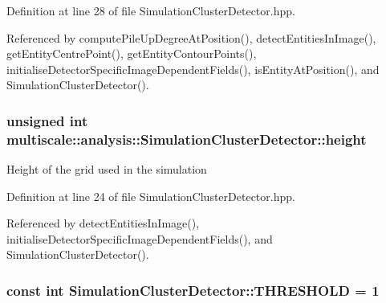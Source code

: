 \-Definition at line 28 of file \-Simulation\-Cluster\-Detector.\-hpp.



\-Referenced by compute\-Pile\-Up\-Degree\-At\-Position(), detect\-Entities\-In\-Image(), get\-Entity\-Centre\-Point(), get\-Entity\-Contour\-Points(), initialise\-Detector\-Specific\-Image\-Dependent\-Fields(), is\-Entity\-At\-Position(), and \-Simulation\-Cluster\-Detector().

\hypertarget{classmultiscale_1_1analysis_1_1SimulationClusterDetector_a9d0a0fe5d9ea0f2516d07bf44b1da257}{
\subsubsection[{height}]{\setlength{\rightskip}{0pt plus 5cm}unsigned int {\bf multiscale\-::analysis\-::\-Simulation\-Cluster\-Detector\-::height}}}\label{classmultiscale_1_1analysis_1_1SimulationClusterDetector_a9d0a0fe5d9ea0f2516d07bf44b1da257}
\-Height of the grid used in the simulation 

\-Definition at line 24 of file \-Simulation\-Cluster\-Detector.\-hpp.



\-Referenced by detect\-Entities\-In\-Image(), initialise\-Detector\-Specific\-Image\-Dependent\-Fields(), and \-Simulation\-Cluster\-Detector().

\hypertarget{classmultiscale_1_1analysis_1_1SimulationClusterDetector_a460525b4359afb52b4bde2ebd600122c}{
\subsubsection[{\-T\-H\-R\-E\-S\-H\-O\-L\-D}]{\setlength{\rightskip}{0pt plus 5cm}const int {\bf \-Simulation\-Cluster\-Detector\-::\-T\-H\-R\-E\-S\-H\-O\-L\-D} = 1}}\label{classmultiscale_1_1analysis_1_1SimulationClusterDetector_a460525b4359afb52b4bde2ebd600122c}


